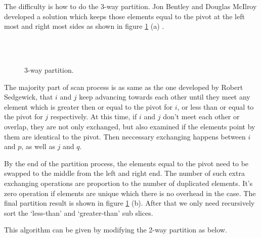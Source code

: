 \documentclass{article}
\begin{document}
The difficulty is how to do the 3-way partition. Jon Bentley and Douglas McIlroy developed a solution
which keeps those elements equal to the pivot at the left most and right most sides as shown in
figure \ref{fig:partition-3-way} (a) \cite{3-way-part} \cite{opt-qs}.

\begin{figure}[htbp]
   \centering
    \\
    \\
   \caption{3-way partition.} 
   \label{fig:partition-3-way}
\end{figure}

The majority part of scan process is as same as the one developed by Robert Sedgewick, that
$i$ and $j$ keep advancing towards each other until they meet any element which is greater then or equal
to the pivot for $i$, or less than or equal to the pivot for $j$ respectively.
At this time, if $i$ and $j$ don't meet each other or overlap, they are not only 
exchanged, but also examined if the elements point by them are identical to the pivot.
Then neccessary exchanging happens between $i$ and $p$, as well as $j$ and $q$.

By the end of the partition process, the elements equal to the pivot need to be swapped to the middle
from the left and right end. The number of such extra exchanging operations are proportion to the
number of duplicated elements. It's zero operation if elements are unique which there is no overhead
in the case. The final partition result is shown in figure \ref{fig:partition-3-way} (b). After that
we only need recursively sort the `less-than' and `greater-than' sub slices.

This algorithm can be given by modifying the 2-way partition as below.
\end{document}
